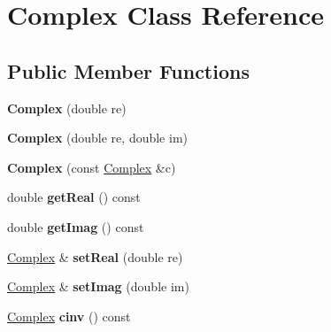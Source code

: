 \hypertarget{class_complex}{\section{Complex Class Reference}
\label{class_complex}
}
\subsection*{Public Member Functions}
\begin{DoxyCompactItemize}
\item 
\hypertarget{class_complex_a46cdd118af1e15aff4235f843dd46e33}{{\bfseries Complex} (double re)}\label{class_complex_a46cdd118af1e15aff4235f843dd46e33}

\item 
\hypertarget{class_complex_a83d613f319cfea93b1a70c57801cdf80}{{\bfseries Complex} (double re, double im)}\label{class_complex_a83d613f319cfea93b1a70c57801cdf80}

\item 
\hypertarget{class_complex_ad6b6aba985d85982e621b244c5533ce6}{{\bfseries Complex} (const \hyperlink{class_complex}{Complex} \&c)}\label{class_complex_ad6b6aba985d85982e621b244c5533ce6}

\item 
\hypertarget{class_complex_abe3d69aff637b06e1c1f73c14368d77d}{double {\bfseries get\-Real} () const }\label{class_complex_abe3d69aff637b06e1c1f73c14368d77d}

\item 
\hypertarget{class_complex_a06791ae9b7d850ef7de11d93e997af94}{double {\bfseries get\-Imag} () const }\label{class_complex_a06791ae9b7d850ef7de11d93e997af94}

\item 
\hypertarget{class_complex_af77a0cddad01cc6cd3e3d583adc43a6a}{\hyperlink{class_complex}{Complex} \& {\bfseries set\-Real} (double re)}\label{class_complex_af77a0cddad01cc6cd3e3d583adc43a6a}

\item 
\hypertarget{class_complex_a1b11752ffc42c97acfc377b74051a4f8}{\hyperlink{class_complex}{Complex} \& {\bfseries set\-Imag} (double im)}\label{class_complex_a1b11752ffc42c97acfc377b74051a4f8}

\item 
\hypertarget{class_complex_a0d93038308950368241a01feb4d5f8e7}{\hyperlink{class_complex}{Complex} {\bfseries cinv} () const }\label{class_complex_a0d93038308950368241a01feb4d5f8e7}


\end{DoxyCompactItemize}

